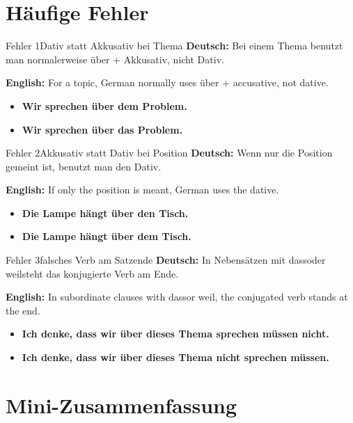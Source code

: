 \documentclass[a4paper,11pt]{article}
\newcommand{\GermanText}[1]{\textbf{Deutsch: }#1\par}
\newcommand{\EnglishText}[1]{{\small\color{SoftGray}\textbf{English: }#1\par}}
\newcommand{\Correct}[1]{\textcolor{HeaderBlueDark}{\textbf{#1}}}
\newcommand{\Wrong}[1]{\textcolor{red!70!black}{\textbf{#1}}}
\begin{document}
\section{Häufige Fehler}

\begin{grammarentry}{Fehler 1}{Dativ statt Akkusativ bei Thema}
\GermanText{Bei einem Thema benutzt man normalerweise \glqq über + Akkusativ\grqq, nicht Dativ.}
\EnglishText{For a topic, German normally uses \glqq über + accusative\grqq, not dative.}
\begin{itemize}
    \item \Wrong{Wir sprechen über dem Problem.}
    \item \Correct{Wir sprechen über das Problem.}
\end{itemize}
\end{grammarentry}

\begin{grammarentry}{Fehler 2}{Akkusativ statt Dativ bei Position}
\GermanText{Wenn nur die Position gemeint ist, benutzt man den Dativ.}
\EnglishText{If only the position is meant, German uses the dative.}
\begin{itemize}
    \item \Wrong{Die Lampe hängt über den Tisch.}
    \item \Correct{Die Lampe hängt über dem Tisch.}
\end{itemize}
\end{grammarentry}

\begin{grammarentry}{Fehler 3}{falsches Verb am Satzende}
\GermanText{In Nebensätzen mit \glqq dass\grqq oder \glqq weil\grqq steht das konjugierte Verb am Ende.}
\EnglishText{In subordinate clauses with \glqq dass\grqq or \glqq weil\grqq, the conjugated verb stands at the end.}
\begin{itemize}
    \item \Wrong{Ich denke, dass wir über dieses Thema sprechen müssen nicht.}
    \item \Correct{Ich denke, dass wir über dieses Thema nicht sprechen müssen.}
\end{itemize}
\end{grammarentry}

\section{Mini-Zusammenfassung}
\end{document}
